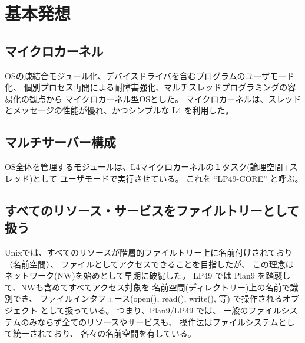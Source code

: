 \documentclass[draft]{ipsjpapers}
\begin{document}

\section{基本発想}

\subsection{マイクロカーネル}

   OSの疎結合モジュール化、デバイスドライバを含むプログラムのユーザモード化、
  個別プロセス再開による耐障害強化、マルチスレッドプログラミングの容易化の観点から
  マイクロカーネル型OSとした。
  マイクロカーネルは、スレッドとメッセージの性能が優れ、かつシンプルな
  L4 を利用した。

\subsection{マルチサーバー構成}
 
 OS全体を管理するモジュールは、L4マイクロカーネルの１タスク(論理空間+スレッド)として
  ユーザモードで実行させている。
  これを ``LP49-CORE'' と呼ぶ。　


\subsection{すべてのリソース・サービスをファイルトリーとして扱う}

   Unixでは、すべてのリソースが階層的ファイルトリー上に名前付けされており（名前空間）、
  ファイルとしてアクセスできることを目指したが、
  この理念はネットワーク(NW)を始めとして早期に破綻した。
  LP49 では Plan9 を踏襲して、NWも含めてすべてアクセス対象を
  名前空間(ディレクトリー)上の名前で識別でき、
  ファイルインタフェース(open(), read(), write(), 等) で操作されるオブジェクト
  として扱っている。
  つまり、Plan9/LP49 では、
  一般のファイルシステムのみならず全てのリソースやサービスも、
  操作法はファイルシステムとして統一されており、
  各々の名前空間を有している。　
\end{document}
